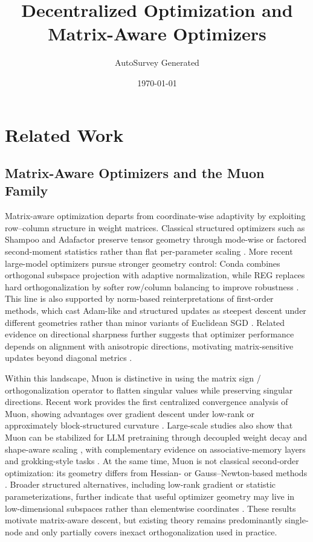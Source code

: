 \documentclass[11pt]{article}
\title{Decentralized Optimization and Matrix-Aware Optimizers}
\author{AutoSurvey Generated}
\date{\today}
\begin{document}
\maketitle

\section{Related Work}

\subsection{Matrix-Aware Optimizers and the Muon Family}

Matrix-aware optimization departs from coordinate-wise adaptivity by exploiting row--column structure in weight matrices. Classical structured optimizers such as Shampoo and Adafactor preserve tensor geometry through mode-wise or factored second-moment statistics rather than flat per-parameter scaling \citep{gupta2018shampoo, shazeer2018adafactor}. More recent large-model optimizers pursue stronger geometry control: Conda combines orthogonal subspace projection with adaptive normalization, while REG replaces hard orthogonalization by softer row/column balancing to improve robustness \citep{wang2025conda, liu2025reg}. This line is also supported by norm-based reinterpretations of first-order methods, which cast Adam-like and structured updates as steepest descent under different geometries rather than minor variants of Euclidean SGD \citep{bernstein2024old, adam2014method}. Related evidence on directional sharpness further suggests that optimizer performance depends on alignment with anisotropic directions, motivating matrix-sensitive updates beyond diagonal metrics \citep{Pan2023TowardUW}.

Within this landscape, Muon is distinctive in using the matrix sign / orthogonalization operator to flatten singular values while preserving singular directions. Recent work provides the first centralized convergence analysis of Muon, showing advantages over gradient descent under low-rank or approximately block-structured curvature \citep{shen2025convergence}. Large-scale studies also show that Muon can be stabilized for LLM pretraining through decoupled weight decay and shape-aware scaling \citep{liu2025muon, loshchilov2017decoupled}, with complementary evidence on associative-memory layers and grokking-style tasks \citep{wang2025muon, tveit2025muon}. At the same time, Muon is not classical second-order optimization: its geometry differs from Hessian- or Gauss--Newton-based methods \citep{Li2022BlackBL, abreu2025potential}. Broader structured alternatives, including low-rank gradient or statistic parameterizations, further indicate that useful optimizer geometry may live in low-dimensional subspaces rather than elementwise coordinates \citep{Zhao2024GaLoreML, Robert2024LDAdamAO, zhu2024apollo}. These results motivate matrix-aware descent, but existing theory remains predominantly single-node and only partially covers inexact orthogonalization used in practice.
\end{document}
